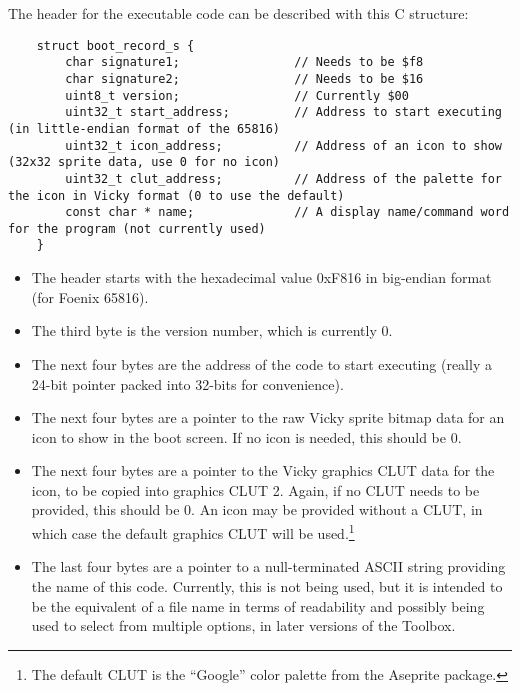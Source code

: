 The header for the executable code can be described with this C structure:
\begin{lstlisting}
	struct boot_record_s {
		char signature1;				// Needs to be $f8
		char signature2;				// Needs to be $16
		uint8_t version;				// Currently $00
		uint32_t start_address;			// Address to start executing (in little-endian format of the 65816)
		uint32_t icon_address;			// Address of an icon to show (32x32 sprite data, use 0 for no icon)
		uint32_t clut_address;			// Address of the palette for the icon in Vicky format (0 to use the default)
		const char * name;				// A display name/command word for the program (not currently used)
	}
\end{lstlisting}

\begin{itemize}
	\item The header starts with the hexadecimal value 0xF816 in big-endian format (for Foenix 65816).
	\item The third byte is the version number, which is currently 0.
	\item The next four bytes are the address of the code to start executing (really a 24-bit pointer packed into 32-bits for convenience).
	\item The next four bytes are a pointer to the raw Vicky sprite bitmap data for an icon to show in the boot screen.
	      If no icon is needed, this should be 0.
	\item The next four bytes are a pointer to the Vicky graphics CLUT data for the icon, to be copied into graphics CLUT 2.
	      Again, if no CLUT needs to be provided, this should be 0. An icon may be provided without a CLUT, in which case the default
		  graphics CLUT will be used.\footnote{The default CLUT is the ``Google'' color palette from the Aseprite package.}
	\item The last four bytes are a pointer to a null-terminated ASCII string providing the name of this code. Currently, this is
	      not being used, but it is intended to be the equivalent of a file name in terms of readability and possibly being used
		  to select from multiple options, in later versions of the Toolbox.
\end{itemize}